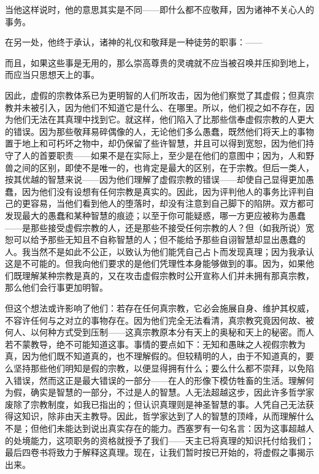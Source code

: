 当他这样说时，他的意思其实是不同——即什么都不应敬拜，因为诸神不关心人的事务。\par

在另一处，他终于承认，诸神的礼仪和敬拜是一种徒劳的职事：——\par

\par

而且，如果这些事是无用的，那么崇高尊贵的灵魂就不应当被召唤并压抑到地上，而应当只思想天上的事。\par

因此，虚假的宗教体系已为更明智的人们所攻击，因为他们察觉了其虚假；但真宗教并未被引入，因为他们不知道它是什么、在哪里。所以，他们视之如不存在，因为他们无法在其真理中找到它。就这样，他们陷入了比那些信奉虚假宗教的人更大的错误。因为那些敬拜易碎偶像的人，无论他们多么愚蠢，既然他们将天上的事物置于地上和可朽坏之物中，却仍保留了些许智慧，并且可以得到宽恕，因为他们持守了人的首要职责——如果不是在实际上，至少是在他们的意图中；因为，人和野兽之间的区别，即使不是唯一的，也肯定是最大的区别，在于宗教。但后一类人，按其优越的智慧来说——因为他们理解了虚假宗教的错误——却使自己显得更加愚蠢，因为他们没有设想有任何宗教是真实的。因此，因为评判他人的事务比评判自己的更容易，当他们看到他人的堕落时，却没有注意到自己脚下的陷阱。双方都可发现最大的愚蠢和某种智慧的痕迹；以至于你可能疑惑，哪一方更应被称为愚蠢——是那些接受虚假宗教的人，还是那些不接受任何宗教的人？但（如我所说）宽恕可以给予那些无知且不自称智慧的人；但不能给予那些自诩智慧却显出愚蠢的人。我当然不是如此不公正，以致认为他们能凭自己占卜而发现真理；因为我承认这是不可能的。但我向他们要求的是他们凭理性本身能够做到的事。因为，如果他们既理解某种宗教是真的，又在攻击虚假宗教时公开宣称人们并未拥有那真宗教，那么他们会行事更加明智。\par

但这个想法或许影响了他们：若存在任何真宗教，它必会施展自身、维护其权威，不容许任何与之对立的事物存在。因为他们完全无法看清，真宗教究竟因何故、被何人、以何种方式受到压制——这真宗教原本分有天上的奥秘和天上的秘密。而人若不蒙教导，绝不可能知道这事。事情的要点如下：无知和愚昧之人视假宗教为真，因为他们既不知道真的，也不理解假的。但较精明的人，由于不知道真的，要么坚持那些他们明知是假的宗教，以便显得拥有什么；要么什么都不崇拜，以免陷入错误，然而这正是最大错误的一部分——在人的形像下模仿牲畜的生活。理解何为假，确实是智慧的一部分，不过是人的智慧。人无法超越这步，因此许多哲学家废除了宗教制度，如我已指出的；但认识真理则是神圣智慧的事。人凭自己无法获得这知识，除非由天主教导。因此，哲学家达到了人的智慧的顶峰，从而理解什么不是；但他们未能达到说出真实存在的能力。西塞罗有一句名言：因为这事超越人的处境能力，这项职务的资格就授予了我们——天主已将真理的知识托付给我们；最后四卷书将致力于解释这真理。现在，让我们暂时按已开始的，将虚假之事揭示出来。\par

